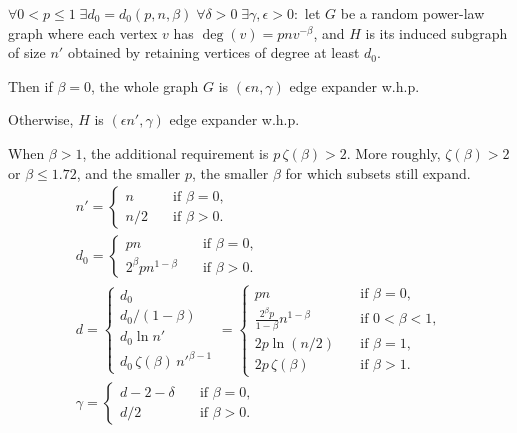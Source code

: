\begin{theorem}
    \label{thm:powerlaw-permutation-edge-expansion}
    $\forall 0<p\leq 1\;\exists d_0=d_0(p,n,\beta)\;\forall\delta>0\;\exists\gamma,\epsilon>0:$
    let $G$ be a random power-law graph where each vertex $v$ has $\deg(v)=pnv^{-\beta}$,
    and $H$ is its induced subgraph of size $n'$ obtained by retaining vertices of degree at least $d_0$.
    
    Then if $\beta=0$, the whole graph $G$ is $(\epsilon n,\gamma)$ edge expander w.h.p.
    
    Otherwise, $H$ is $(\epsilon n',\gamma)$ edge expander w.h.p.
    
    When $\beta>1$, the additional requirement is $p\,\zeta(\beta)>2$.
    More roughly, $\zeta(\beta)>2$ or $\beta\leq 1.72$,
    and the smaller $p$, the smaller $\beta$ for which subsets still expand.
    \begin{gather}
        n'=
        \begin{cases}
            n & \quad \text{if } \beta=0,\\
            n/2 & \quad \text{if } \beta>0.
        \end{cases}\\
        d_0=
        \begin{cases}
            pn & \quad \text{if } \beta=0,\\
            2^\beta pn^{1-\beta} & \quad \text{if } \beta>0.
        \end{cases}\\
        d=
        \begin{cases}
            d_0\\
            d_0/(1-\beta)\\
            d_0\ln n'\\
            d_0\,\zeta(\beta)\,n'^{\beta-1}
        \end{cases}=
        \begin{cases}
            pn & \quad \text{if } \beta=0,\\
            \frac{2^\beta p}{1-\beta}n^{1-\beta} & \quad \text{if } 0<\beta<1,\\
            2p\ln(n/2) & \quad \text{if } \beta=1,\\
            2p\,\zeta(\beta) & \quad \text{if } \beta>1.
        \end{cases}\\
        \gamma=\begin{cases}
            d-2-\delta & \quad \text{if } \beta=0,\\
            d/2 & \quad \text{if } \beta>0.
        \end{cases}
    \end{gather}
\end{theorem}

